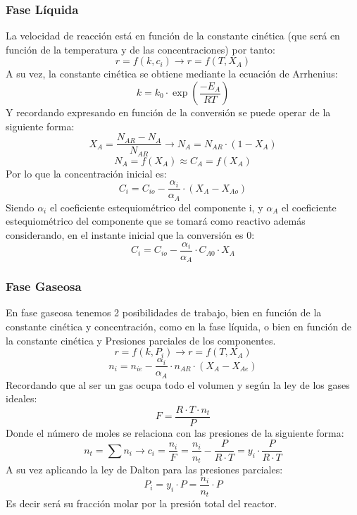 \subsubsection{Fase Líquida}
La velocidad de reacción está en función de la constante cinética (que será en función de la temperatura y de las concentraciones) por tanto:
\begin{equation}
  r = f(k,c_i) \rightarrow r=f(T,X_A)
\end{equation}
A su vez, la constante cinética se obtiene mediante la ecuación de Arrhenius:
\begin{equation}
  k = k_0 \cdot \exp\left(\frac{-E_A}{RT}\right)
\end{equation}
Y recordando expresando en función de la conversión se puede operar de la siguiente forma:
\begin{equation}
  X_A = \frac{N_{AR}-N_A}{N_{AR}} \rightarrow N_A = N_{AR} \cdot (1-X_A)
\end{equation}
\begin{equation*}
  N_A = f(X_A) \approx C_A = f(X_A)
\end{equation*}
Por lo que la concentración inicial es:
\begin{equation}
  C_{i} = C_{io} - \frac{\alpha_i}{\alpha_A} \cdot (X_A-X_{Ao})
\end{equation}
Siendo $\alpha_i$ el coeficiente estequiométrico del componente i, y $\alpha_A$ el coeficiente estequiométrico del componente que se tomará como reactivo además considerando, en el instante inicial que la conversión es 0:
\begin{equation}
  C_{i} = C_{io} - \frac{\alpha_i}{\alpha_A} \cdot C_{A0} \cdot X_A
\end{equation}
\newpage
\subsubsection{Fase Gaseosa}
En fase gaseosa tenemos 2 posibilidades de trabajo, bien en función de la constante cinética y concentración, como en la fase líquida, o bien en función de la constante cinética y Presiones parciales de los componentes.
\begin{equation*}
  r = f(k,P_i) \rightarrow r=f(T,X_A)
\end{equation*}
\begin{equation*}
  n_i = n_{ie} - \frac{\alpha_i}{\alpha_A} \cdot n_{AR} \cdot (X_A-X_{Ae})
\end{equation*}
Recordando que al ser un gas ocupa todo el volumen y según la ley de los gases ideales:
\begin{equation}
  F = \frac{R \cdot T \cdot n_t}{P}
\end{equation}
Donde el número de moles se relaciona con las presiones de la siguiente forma:
\begin{equation}
  n_t = \sum n_i \rightarrow c_i = \frac{n_i}{F} = \frac{n_i}{n_t}-\frac{P}{R \cdot T} = y_i \cdot \frac{P}{R \cdot T}
\end{equation}
A su vez aplicando la ley de Dalton para las presiones parciales:
\begin{equation}
  P_i = y_i \cdot P = \frac{n_i}{n_t} \cdot P
\end{equation}
Es decir será su fracción molar por la presión total del reactor.
